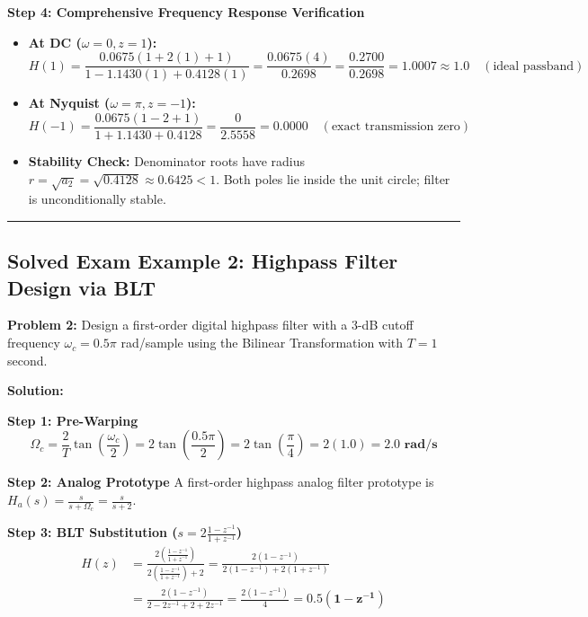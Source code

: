 \documentclass[11pt,a4paper]{article}
\begin{document}
\noindent\textbf{Step 4: Comprehensive Frequency Response Verification}
\begin{itemize}
    \item \textbf{At DC ($\omega = 0, z = 1$):}
    \begin{equation}
    H(1) = \frac{0.0675(1 + 2(1) + 1)}{1 - 1.1430(1) + 0.4128(1)} = \frac{0.0675(4)}{0.2698} = \frac{0.2700}{0.2698} = \mathbf{1.0007} \approx 1.0 \quad (\text{ideal passband})
    \end{equation}
    \item \textbf{At Nyquist ($\omega = \pi, z = -1$):}
    \begin{equation}
    H(-1) = \frac{0.0675(1 - 2 + 1)}{1 + 1.1430 + 0.4128} = \frac{0}{2.5558} = \mathbf{0.0000} \quad (\text{exact transmission zero})
    \end{equation}
    \item \textbf{Stability Check:} Denominator roots have radius $r = \sqrt{a_2} = \sqrt{0.4128} \approx 0.6425 < 1$. Both poles lie inside the unit circle; filter is unconditionally stable.
\end{itemize}

\noindent\rule{\textwidth}{0.5pt}

\subsection*{Solved Exam Example 2: Highpass Filter Design via BLT}

\textbf{Problem 2:} Design a first-order digital highpass filter with a 3-dB cutoff frequency $\omega_c = 0.5\pi$ rad/sample using the Bilinear Transformation with $T = 1$ second.

\vspace{1mm}
\noindent\textbf{Solution:}

\noindent\textbf{Step 1: Pre-Warping}
\begin{equation}
\Omega_c = \frac{2}{T} \tan\left(\frac{\omega_c}{2}\right) = 2 \tan\left(\frac{0.5\pi}{2}\right) = 2 \tan\left(\frac{\pi}{4}\right) = 2(1.0) = \mathbf{2.0 \text{ rad/s}}
\end{equation}

\noindent\textbf{Step 2: Analog Prototype}
A first-order highpass analog filter prototype is $H_a(s) = \frac{s}{s + \Omega_c} = \frac{s}{s + 2}$.

\noindent\textbf{Step 3: BLT Substitution ($s = 2 \frac{1 - z^{-1}}{1 + z^{-1}}$)}
\begin{align}
H(z) &= \frac{2\left(\frac{1 - z^{-1}}{1 + z^{-1}}\right)}{2\left(\frac{1 - z^{-1}}{1 + z^{-1}}\right) + 2} = \frac{2(1 - z^{-1})}{2(1 - z^{-1}) + 2(1 + z^{-1})} \nonumber \\
&= \frac{2(1 - z^{-1})}{2 - 2z^{-1} + 2 + 2z^{-1}} = \frac{2(1 - z^{-1})}{4} = \mathbf{0.5 (1 - z^{-1})}
\end{align}
\end{document}
